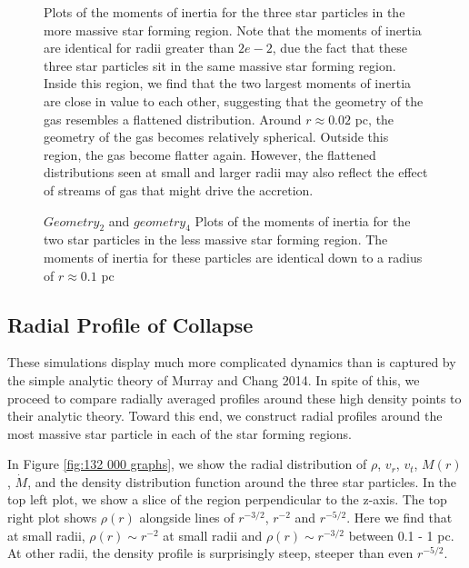\documentclass{emulateapj}
\begin{document}
\begin{figure}
\caption{Plots of the moments of inertia for the three star particles in the more massive star forming region.  Note that the moments of inertia are identical for radii greater than $2e-2$, due the fact that these three star particles sit in the same massive star forming region.  Inside this region, we find that the two largest moments of inertia are close in value to each other, suggesting that the geometry of the gas resembles a flattened distribution. Around $r\approx 0.02$ pc, the geometry of the gas becomes relatively spherical.  Outside this region, the gas become flatter again. However, the flattened distributions seen at small and larger radii may also reflect the effect of streams of gas that might drive the accretion. 
\label{fig:geometry}}
\end{figure}

\begin{figure}
\caption{$Geometry_2$ and $geometry_4$ Plots of the moments of inertia for the two star particles in the less massive star forming region.  The moments of inertia for these particles are identical down to a radius of $r\approx 0.1$ pc
\label{fig:geometry 2}}
\end{figure}


 


\subsection{Radial Profile of Collapse}

These simulations display much more complicated dynamics than is captured by the simple analytic theory of Murray and Chang 2014.  In spite of this, we proceed to compare radially averaged profiles around these high density points to their analytic theory.  Toward this end, we construct radial profiles around the most massive star particle in each of the star forming regions.

In Figure \ref{fig:132 000 graphs}, we show the radial distribution of $\rho$, $v_r$, $v_t$, $M(r)$, $\dot{M}$, and the density distribution function around the three star particles.  In the top left plot, we show a slice of the region perpendicular to the z-axis.  The top right plot shows $\rho(r)$ alongside lines of $r^{-3/2}$, $r^{-2}$ and $r^{-5/2}$.  Here we find that at small radii, $\rho(r)\sim r^{-2}$ at small radii and $\rho(r) \sim r^{-3/2}$ between 0.1 - 1 pc. At other radii, the density profile is surprisingly steep, steeper than even $r^{-5/2}$.
\end{document}
